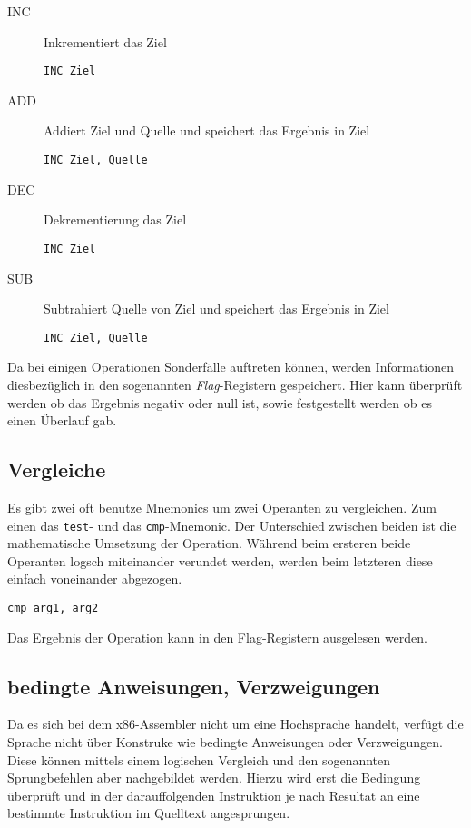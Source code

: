 \begin{description}
	\item [INC] Inkrementiert das Ziel
		\begin{verbatim}INC Ziel\end{verbatim}

	\item [ADD] Addiert Ziel und Quelle und speichert das Ergebnis in Ziel
		\begin{verbatim}INC Ziel, Quelle\end{verbatim}

	\item [DEC] Dekrementierung  das Ziel
		\begin{verbatim}INC Ziel\end{verbatim}

	\item [SUB] Subtrahiert Quelle von Ziel und speichert das Ergebnis in Ziel
		\begin{verbatim}INC Ziel, Quelle\end{verbatim}
\end{description}

Da bei einigen Operationen Sonderfälle auftreten können, werden Informationen diesbezüglich in den sogenannten \textit{Flag}-Registern gespeichert.
Hier kann überprüft werden ob das Ergebnis negativ oder null ist, sowie festgestellt werden ob es einen Überlauf gab.

\subsection{Vergleiche}
Es gibt zwei oft benutze Mnemonics um zwei Operanten zu vergleichen. Zum einen das \texttt{test}- und das \texttt{cmp}-Mnemonic.
Der Unterschied zwischen beiden ist die mathematische Umsetzung der Operation. Während beim ersteren beide Operanten logsch miteinander verundet werden, werden beim letzteren diese einfach voneinander abgezogen. 

\begin{verbatim}cmp arg1, arg2\end{verbatim}

Das Ergebnis der Operation kann in den Flag-Registern ausgelesen werden.


\subsection{bedingte Anweisungen, Verzweigungen}
Da es sich bei dem x86-Assembler nicht um eine Hochsprache handelt, verfügt die Sprache nicht über Konstruke wie bedingte Anweisungen oder Verzweigungen.
Diese können mittels einem logischen Vergleich und den sogenannten Sprungbefehlen aber nachgebildet werden.  
Hierzu wird erst die Bedingung überprüft und in der darauffolgenden Instruktion je nach Resultat an eine bestimmte Instruktion im Quelltext angesprungen. 

